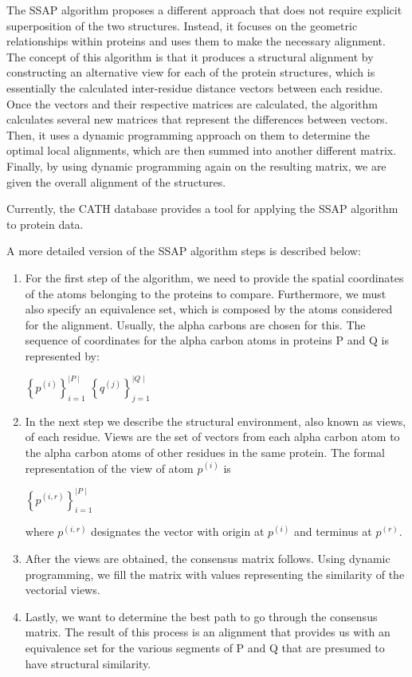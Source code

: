 The SSAP \cite{orengo199636} algorithm proposes a different approach that does not require explicit superposition of the two structures. Instead, it focuses on the geometric relationships within proteins and uses them to make the necessary alignment. The concept of this algorithm is that it produces a structural alignment by constructing an alternative view for each of the protein structures, which is essentially the calculated inter-residue distance vectors between each residue. Once the vectors and their respective matrices are calculated, the algorithm calculates several new matrices that represent the differences between vectors. Then, it uses a dynamic programming approach on them to determine the optimal local alignments, which are then summed into another different matrix. Finally, by using dynamic programming again on the resulting matrix, we are given the overall alignment of the structures.

Currently, the CATH database \cite{sillitoe2014cath} provides a tool for applying the SSAP algorithm to protein data.

A more detailed version of the SSAP algorithm steps is described below:
\begin{enumerate}
	
	\item For the first step of the algorithm, we need to provide the spatial coordinates of the atoms belonging to the proteins to compare. Furthermore, we must also specify an equivalence set, which is composed by the atoms considered for the alignment. Usually, the alpha carbons are chosen for this. The sequence of coordinates for the alpha carbon atoms in proteins P and Q is represented by:
	
	\begin{center}
		$\left\{  p^{(i)} \right\}_{i=1}^{\mid P \mid}$ \qquad $\left\{  q^{(j)} \right\}_{j=1}^{\mid Q \mid}$
	\end{center}
	
	\item In the next step we describe the structural environment, also known as views, of each residue. Views are the set of vectors from each alpha carbon atom to the alpha carbon atoms of other residues in the same protein. The formal representation of the view of atom $p^{(i)}$ is
	
	\begin{center}
		$\left\{  p^{(i,r)} \right\}_{i=1}^{\mid P \mid}$
	\end{center} 
	
	where $p^{(i,r)}$ designates the vector with origin at $p^{(i)}$ and terminus at $p^{(r)}$.
	
	\item After the views are obtained, the consensus matrix follows. Using dynamic programming, we fill the matrix with values representing the similarity of the vectorial views. 
	
	\item Lastly, we want to determine the best path to go through the consensus matrix. The result of this process is an alignment that provides us with an equivalence set for the various segments of P and Q that are presumed to have structural similarity.
\end{enumerate}

